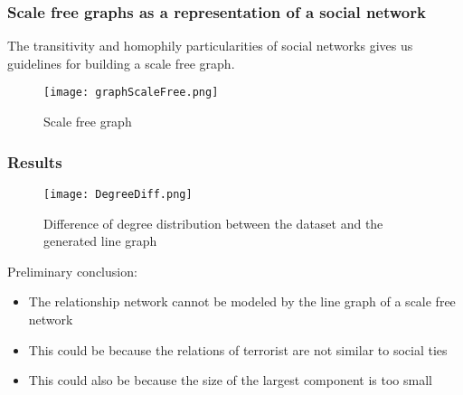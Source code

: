 \begin{frame}
\frametitle{Scale free graphs as a representation of a social network}


The transitivity and homophily particularities of social networks gives us guidelines for building a scale free graph.


\begin{figure}[H]
\begin{center}
\texttt{[image: graphScaleFree.png]}
\caption{Scale free graph}
\label{fig:ScaleF}
\end{center}
\end{figure}
\end{frame}


\begin{frame}
\frametitle{Results}

\begin{figure}[H]
\begin{center}
\texttt{[image: DegreeDiff.png]}
\caption{Difference of degree distribution between the dataset and the generated line graph}
\label{fig:degdiff}
\end{center}
\end{figure}

Preliminary conclusion:
\begin{itemize}
\item The relationship network cannot be modeled by the line graph of a scale free network
\item This could be because the relations of terrorist are not similar to social ties
\item This could also be because the size of the largest component is too small
\end{itemize}

\end{frame}